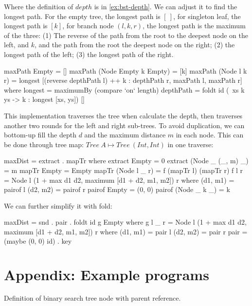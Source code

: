 \documentclass[b5paper]{article}
\begin{document}
\begin{Answer}[ref={ex:bst-delete}]
{Where the definition of $depth$ is in \cref{ex:bst-depth}. We can adjust it to find the longest path. For the empty tree, the longest path is $[\ ]$, for singleton leaf, the longest path is $[k]$, for branch node $(l, k, r)$, the longest path is the maximum of the three: (1) The reverse of the path from the root to the deepest node on the left, and $k$, and the path from the root the deepest node on the right; (2) the longest path of the left; (3) the longest path of the right.

\begin{Haskell}
maxPath Empty = []
maxPath (Node Empty k Empty) = [k]
maxPath (Node l k r) = longest [(reverse depthPath l) ++ k : depthPath r,
                         maxPath l, maxPath r] where
  longest = maximumBy (compare `on` length)
  depthPath = foldt id (\ xs k ys -> k : longest [xs, ys]) []
\end{Haskell}

This implementation traverses the tree when calculate the depth, then traverses another two rounds for the left and right sub-trees. To avoid duplication, we can bottom-up fill the depth $d$ and the maximum distance $m$ in each node. This can be done through tree map: $Tree\ A \mapsto Tree\ (Int, Int)$ in one traverse:

\begin{Haskell}
maxDist = extract . mapTr where
  extract Empty = 0
  extract (Node _ (_, m) _) = m
  mapTr Empty = Empty
  mapTr (Node l _ r) = f (mapTr l) (mapTr r)
  f l r = Node l (1 + max d1 d2, maximum [d1 + d2, m1, m2]) r where
    (d1, m1) = pairof l
    (d2, m2) = pairof r
    pairof Empty = (0, 0)
    pairof (Node _ k _) = k
\end{Haskell}

We can further simplify it with fold:

\begin{Haskell}
maxDist = snd . pair . foldt id g Empty where
  g l _ r = Node l (1 + max d1 d2, maximum [d1 + d2, m1, m2]) r where
    (d1, m1) = pair l
    (d2, m2) = pair r
  pair = (maybe (0, 0) id) . key
\end{Haskell}
}
\end{Answer}

\section{Appendix: Example programs}

Definition of binary search tree node with parent reference.
\end{document}

